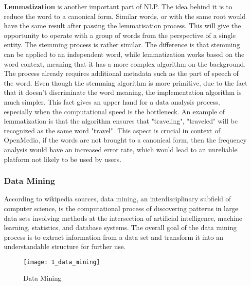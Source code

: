 \textbf{Lemmatization} is another important part of NLP. The idea behind it is to reduce the word to a canonical form. Similar words, or with the same root would have the same result after passing the lemmatisation process. This will give the opportunity to operate with a group of words from the perspective of a single entity. The stemming process is rather similar. The difference is that stemming can be applied to an independent word, while lemmatization works based on the word context, meaning that it has a more complex algorithm on the background. The process already requires additional metadata such as the part of speech of the word. Even though the stemming algorithm is more primitive, due to the fact that it doesn't discriminate the word meaning, the implementation algorithm is much simpler. This fact gives an upper hand for a data analysis process, especially when the computational speed is the bottleneck. An example of lemmatization is that the algorithm ensures that "traveling", "traveled" will be recognized as the same word "travel". This aspect is crucial in context of OpenMedia, if the words are not brought to a canonical form, then the frequency analysis would have an increased error rate, which would lead to an unreliable platform not likely to be used by users.

\subsubsection{Data Mining}
According to wikipedia sources, data mining, an interdisciplinary subfield of computer science, is the computational process of discovering patterns in large data sets involving methods at the intersection of artificial intelligence, machine learning, statistics, and database systems. The overall goal of the data mining process is to extract information from a data set and transform it into an understandable structure for further use. \cite{wiki_data_mining}

\begin{figure}[!ht]
\centering
\texttt{[image: 1\_data\_mining]}
\caption{Data Mining}\label{data_mining}
\end{figure}

